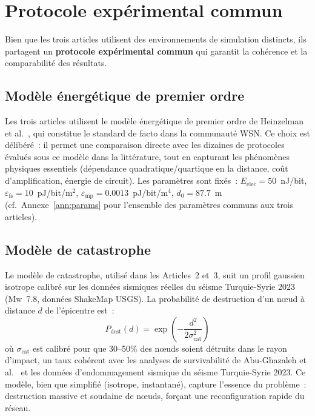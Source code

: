 \section{Protocole expérimental commun}\label{sec:demarche-protocole}

Bien que les trois articles utilisent des environnements de simulation distincts, ils partagent un \textbf{protocole expérimental commun} qui garantit la cohérence et la comparabilité des résultats.

\subsection{Modèle énergétique de premier ordre}

Les trois articles utilisent le modèle énergétique de premier ordre de Heinzelman et al.\ \cite{heinzelman2000leach}, qui constitue le standard de facto dans la communauté WSN. Ce choix est délibéré~: il permet une comparaison directe avec les dizaines de protocoles évalués sous ce modèle dans la littérature, tout en capturant les phénomènes physiques essentiels (dépendance quadratique/quartique en la distance, coût d'amplification, énergie de circuit). Les paramètres sont fixés~: $E_{\text{elec}} = 50$~nJ/bit, $\varepsilon_{\text{fs}} = 10$~pJ/bit/m$^2$, $\varepsilon_{\text{mp}} = 0.0013$~pJ/bit/m$^4$, $d_0 = 87.7$~m (cf.\ Annexe~\ref{ann:params} pour l'ensemble des paramètres communs aux trois articles).

\subsection{Modèle de catastrophe}

Le modèle de catastrophe, utilisé dans les Articles~2 et~3, suit un profil gaussien isotrope calibré sur les données sismiques réelles du séisme Turquie-Syrie 2023 (Mw~7.8, données ShakeMap USGS). La probabilité de destruction d'un n\oe{}ud à distance $d$ de l'épicentre est~:
\begin{equation}\label{eq:disaster-model}
    P_{\text{dest}}(d) = \exp\!\left(-\frac{d^2}{2\sigma_{\text{cat}}^2}\right)
\end{equation}
où $\sigma_{\text{cat}}$ est calibré pour que 30--50\% des n\oe{}uds soient détruits dans le rayon d'impact, un taux cohérent avec les analyses de survivabilité de Abu-Ghazaleh et al.\ \cite{AbuGhazaleh2007WSNSurvivability} et les données d'endommagement sismique du séisme Turquie-Syrie 2023. Ce modèle, bien que simplifié (isotrope, instantané), capture l'essence du problème~: destruction massive et soudaine de n\oe{}uds, forçant une reconfiguration rapide du réseau.

